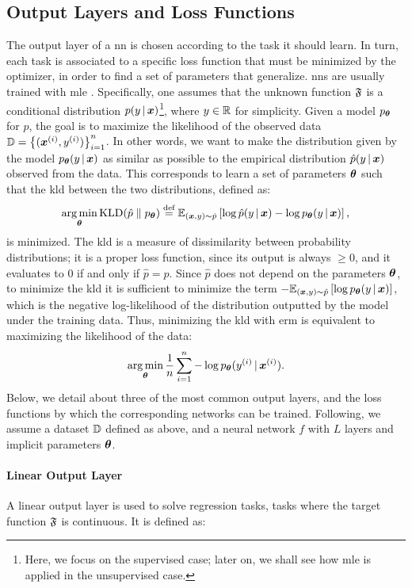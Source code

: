 \subsection{Output Layers and Loss Functions}\label{sec:loss}
The output layer of a \gls{nn} is chosen according to the task it should learn. In turn, each task is associated to a specific loss function that must be minimized by the optimizer, in order to find a set of parameters that generalize. \glspl{nn} are usually trained with \gls{mle} \citep{bishop2006pattern}. Specifically, one assumes that the unknown function $\mathfrak{F}$ is a conditional distribution $p(y\given\Vector{x})$\footnote{Here, we focus on the supervised case; later on, we shall see how \gls{mle} is applied in the unsupervised case.}, where $y \in \mathbb{R}$ for simplicity. Given a model $p_{\boldsymbol{\theta}}$ for $p$, the goal is to maximize the likelihood of the observed data $\Data = \Set{(\PatternVector{x}{i}, \Pattern{y}{i})}_{i=1}^n$. In other words, we want to make the distribution given by the model $p_{\Param}(y\given\Vector{x})$ as similar as possible to the empirical distribution $\hat{p}(y\given\Vector{x})$ observed from the data. This corresponds to learn a set of parameters $\boldsymbol{\theta}$ such that the \gls{kld} between the two distributions, defined as:
$$\argmin_{\Param} \KLD{\hat{p}}{p_{\Param}} \defeq \Expectation{(\Vector{x}, y) \sim \hat{p}}{\log \hat{p}(y \given \Vector{x}) - \log p_{\Param}(y \given \Vector{x})},$$
is minimized. The \gls{kld} is a measure of dissimilarity between probability distributions; it is a proper loss function, since its output is always $\ge 0$, and it evaluates to 0 if and only if $\hat{p} = p$. Since $\hat{p}$ does not depend on the parameters $\boldsymbol{\theta}$, to minimize the \gls{kld} it is sufficient to minimize the term $- \Expectation{(\Vector{x}, y) \sim \hat{p}}{\log p_{\Param}(y \given \Vector{x})}$, which is the negative log-likelihood of the distribution outputted by the model under the training data. Thus, minimizing the \gls{kld} with \gls{erm} is equivalent to maximizing the likelihood of the data:
$$\argmin_{\Param} \frac{1}{n} \sum_{i=1}^n -\log p_{\Param}(\Pattern{y}{i} \given \PatternVector{x}{i}).$$
Below, we detail about three of the most common output layers, and the loss functions by which the corresponding networks can be trained. Following, we assume a dataset $\mathbb{D}$ defined as above, and a neural network $f$ with $L$ layers and implicit parameters $\boldsymbol{\theta}$.

\paragraph{Linear Output Layer}
A linear output layer is used to solve regression tasks, \ie tasks where the target function $\mathfrak{F}$ is continuous. It is defined as:

